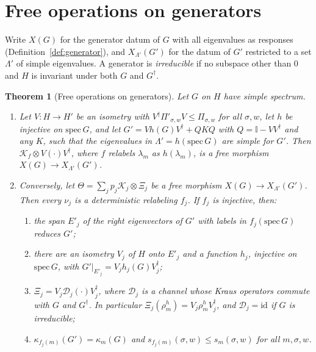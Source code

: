\documentclass[11pt]{article}
\newtheorem{theorem}{Theorem}
\theoremstyle{definition}
\theoremstyle{remark}
\newcommand{\one}{\mathbb{I}}
\begin{document}
\section{Free operations on generators}
\label{sec:gen}

Write $X(G)$ for the generator datum of $G$ with all eigenvalues as responses (Definition~\ref{def:generator}), and $X_{\Lambda'}(G')$ for the datum of $G'$ restricted to a set $\Lambda'$ of simple eigenvalues. A generator is \emph{irreducible} if no subspace other than $0$ and $H$ is invariant under both $G$ and $G^\dagger$.

\begin{theorem}[Free operations on generators]\label{thm:gen}
Let $G$ on $H$ have simple spectrum.
\begin{enumerate}
\item[(a)] Let $V:H\to H'$ be an isometry with $V^\dagger\Pi'_{\sigma,w}V\le\Pi_{\sigma,w}$ for all $\sigma,w$, let $h$ be injective on $\mathrm{spec}\,G$, and let $G'=Vh(G)V^\dagger+QKQ$ with $Q=\one-VV^\dagger$ and any $K$, such that the eigenvalues in $\Lambda'=h(\mathrm{spec}\,G)$ are simple for $G'$. Then $\mathcal K_f\otimes V(\cdot)V^\dagger$, where $f$ relabels $\lambda_m$ as $h(\lambda_m)$, is a free morphism $X(G)\to X_{\Lambda'}(G')$.
\item[(b)] Conversely, let $\Theta=\sum_jp_j\mathcal K_j\otimes\Xi_j$ be a free morphism $X(G)\to X_{\Lambda'}(G')$. Then every $\nu_j$ is a deterministic relabeling $f_j$. If $f_j$ is injective, then:
\begin{enumerate}
\item[(i)] the span $E'_j$ of the right eigenvectors of $G'$ with labels in $f_j(\mathrm{spec}\,G)$ reduces $G'$;
\item[(ii)] there are an isometry $V_j$ of $H$ onto $E'_j$ and a function $h_j$, injective on $\mathrm{spec}\,G$, with $G'|_{E'_j}=V_jh_j(G)V_j^\dagger$;
\item[(iii)] $\Xi_j=V_j\mathcal D_j(\cdot)V_j^\dagger$, where $\mathcal D_j$ is a channel whose Kraus operators commute with $G$ and $G^\dagger$. In particular $\Xi_j(\rho^h_m)=V_j\rho^h_mV_j^\dagger$, and $\mathcal D_j=\mathrm{id}$ if $G$ is irreducible;
\item[(iv)] $\kappa_{f_j(m)}(G')=\kappa_m(G)$ and $s_{f_j(m)}(\sigma,w)\le s_m(\sigma,w)$ for all $m,\sigma,w$.
\end{enumerate}
\end{enumerate}
\end{theorem}
\end{document}
